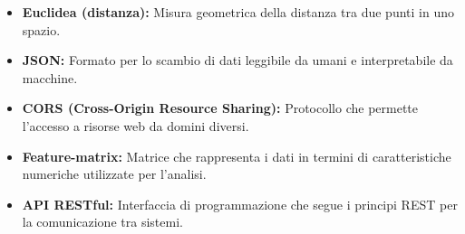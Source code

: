 \documentclass[a4paper,12pt]{article}
\begin{document}
\begin{itemize}
\item \textbf{Euclidea (distanza):} Misura geometrica della distanza tra due punti in uno spazio.
\item \textbf{JSON:} Formato per lo scambio di dati leggibile da umani e interpretabile da macchine.
\item \textbf{CORS (Cross-Origin Resource Sharing):} Protocollo che permette l'accesso a risorse web da domini diversi.
\item \textbf{Feature-matrix:} Matrice che rappresenta i dati in termini di caratteristiche numeriche utilizzate per l'analisi.
\item \textbf{API RESTful:} Interfaccia di programmazione che segue i principi REST per la comunicazione tra sistemi.
\end{itemize}
\end{document}
